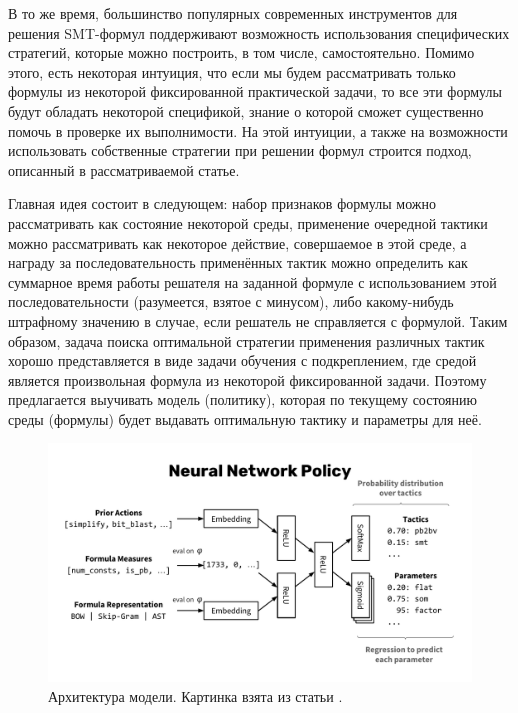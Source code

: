 В то же время, большинство популярных современных инструментов для решения SMT-формул поддерживают возможность использования специфических стратегий, которые можно построить, в том числе, самостоятельно. Помимо этого, есть некоторая интуиция, что если мы будем рассматривать только формулы из некоторой фиксированной практической задачи, то все эти формулы будут обладать некоторой спецификой, знание о которой сможет существенно помочь в проверке их выполнимости. На этой интуиции, а также на возможности использовать собственные стратегии при решении формул строится подход, описанный в рассматриваемой статье.

Главная идея состоит в следующем: набор признаков формулы можно рассматривать как состояние некоторой среды, применение очередной тактики можно рассматривать как некоторое действие, совершаемое в этой среде, а награду за последовательность применённых тактик можно определить как суммарное время работы решателя на заданной формуле с использованием этой последовательности (разумеется, взятое с минусом), либо какому-нибудь штрафному значению в случае, если решатель не справляется с формулой. Таким образом, задача поиска оптимальной стратегии применения различных тактик хорошо представляется в виде задачи обучения с подкреплением, где средой является произвольная формула из некоторой фиксированной задачи. Поэтому предлагается выучивать модель (политику), которая по текущему состоянию среды (формулы) будет выдавать оптимальную тактику и параметры для неё.

\begin{figure}[ht]
\begin{center}
    \includegraphics[scale=0.65]{./assets/fastsmt-nn-policy.pdf}
    \caption{\label{fastsmt-architecture} Архитектура модели. Картинка взята из статьи \cite{fastsmt-paper}.}
\end{center}
\end{figure}


